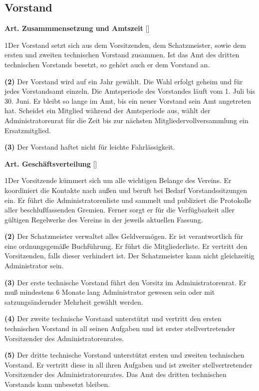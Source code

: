 \documentclass[12pt]{article}
\newcommand{\UAbschnitt}[1]{\subsection{#1}}
\newcommand{\Satz}[2]{

\begin{samepage}
{\bf (#1)} #2
\end{samepage}
}
\newenvironment{Artikel}[2]{
\bigskip \centerline{{\bf Art. #1} [#2]}
\nopagebreak
}{
}
\begin{document}
\UAbschnitt{Vorstand}

\begin{Artikel}{22}{Zusammmensetzung und Amtszeit}

\Satz{1}{Der Vorstand setzt sich aus dem Vorsitzenden, dem Schatzmeister, sowie
dem ersten und zweiten technischen Vorstand zusammen. Ist das Amt des dritten
technischen Vorstands besetzt, so gehört auch er dem Vorstand an.}

\Satz{2}{Der Vorstand wird auf ein Jahr gewählt. Die Wahl erfolgt geheim und
für jedes Vorstandsamt einzeln. Die Amtsperiode des Vorstandes
läuft vom 1. Juli bis 30. Juni. Er bleibt so lange im Amt, bis ein neuer
Vorstand sein Amt angetreten hat. Scheidet ein Mitglied während der Amtsperiode
aus, wählt der Administratorenrat für die Zeit bis zur nächsten
Mitgliedervollversammlung ein Ersatzmitglied.}

\Satz{3}{Der Vorstand haftet nicht für leichte Fahrlässigkeit.}

\end{Artikel}

\begin{Artikel}{23}{Geschäftsverteilung}

\Satz{1}{Der Vorsitzende kümmert sich um alle wichtigen Belange des Vereins. Er
koordiniert die Kontakte nach außen und beruft bei Bedarf Vorstandssitzungen
ein. Er führt die Administratorenliste und sammelt und publiziert die
Protokolle aller beschlußfassenden Gremien. Ferner sorgt er für die
Verfügbarkeit aller gültigen Regelwerke des Vereins in der jeweils aktuellen
Fassung.}

\Satz{2}{Der Schatzmeister verwaltet alles Geldvermögen. Er ist verantwortlich
für eine ordnungsgemäße Buchführung. Er führt die Mitgliederliste. Er vertritt
den Vorsitzenden, falls dieser verhindert ist. Der Schatzmeister kann nicht
gleichzeitig Administrator sein.}

\Satz{3}{Der erste technische Vorstand führt den Vorsitz im Administratorenrat.
Er muß mindestens 6 Monate lang Administrator gewesen sein oder mit
satzungsändernder Mehrheit gewählt werden.}

\Satz{4}{Der zweite technische Vorstand unterstützt und vertritt den ersten
technischen Vorstand in all seinen Aufgaben und ist erster stellvertretender
Vorsitzender des Administratorenrates.}

\Satz{5}{Der dritte technische Vorstand unterstützt ersten und zweiten
technischen Vorstand. Er vertritt diese in all ihren Aufgaben und ist zweiter
stellvertretender Vorsitzender des Administratorenrates.
Das Amt des dritten technischen Vorstands kann unbesetzt bleiben.}

\end{Artikel}
\end{document}
